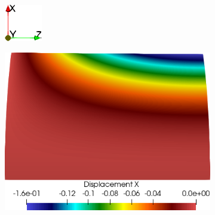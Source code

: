 \begin{figure}[h!]
    \centering
    \caption{\textit{Scordelis-Lo roof} - Campos de deslocamentos obtidos.}
    \begin{subfigure}{0.05\textwidth}
        \includegraphics[width=\linewidth]{Figuras/scordelis/eixos.png}
    \end{subfigure}
    \begin{subfigure}{0.31\textwidth}
        \includegraphics[width=\linewidth]{Figuras/scordelis/ux.png}

\end{subfigure}
\end{figure}
